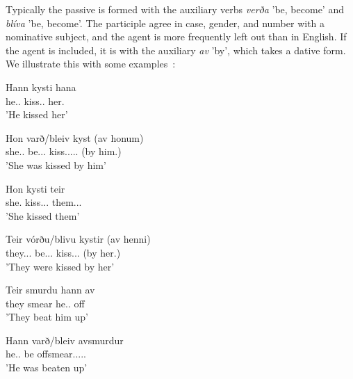 \documentclass[12pt,%
    times,
]{lin-v2/lin}
\begin{document}
Typically the passive is formed with the auxiliary verbs \emph{verða} 'be, become' and \emph{blíva} 'be, become'. 
The participle agree in case, gender, and number with a nominative subject, and the agent is more frequently left
out than in English. If the agent is included, it is with the auxiliary \emph{av} 'by', which takes a dative form.
We illustrate this with some examples~\citep[69]{faroese}:
\begin{exe}
    \ex
    \begin{xlist}
        \item \gll Hann kysti hana\\
        he.\Third\Sg.\Nom{} kiss.\Sg.\Pst{} her.\Third\Sg\Acc\\
        \trans 'He kissed her'
        \item \gll Hon varð/bleiv kyst (av honum)\\
        she.\Third\Sg.\Nom{} be.\Sg.\Pst.\Aux{} kiss.\Nom.\Sg.\F.\Pst.\Ptcp{} (by him.\Dat)\\
        \trans 'She was kissed by him'
    \end{xlist}
    \ex
    \begin{xlist}
        \item \gll Hon kysti teir\\
        she.\Third\Sg\Nom{} kiss.\Sg.\Pst.\Ind{} them.\Acc.\Pl.\M{}\\
        \trans 'She kissed them'
        \item \gll Teir vórðu/blivu kystir (av henni)\\
        they.\Third\Pl.\Nom.\M{} be.\Pl.\Pst.\Aux{} kiss.\Nom.\Pl.\M{} (by her.\Dat)\\
        \trans 'They were kissed by her'
    \end{xlist}
    \ex
    \begin{xlist}
        \item \gll Teir smurdu hann av\\
        they smear he.\Third\Sg.\Acc{} off\\
        \trans 'They beat him up'
        \item \gll Hann varð/bleiv avsmurdur\\
        he.\Third\Sg.\Nom{} be offsmear.\Nom.\Sg.\M.\Pst.\Ptcp\\
        \trans 'He was beaten up'
    \end{xlist}
\end{exe}
\end{document}
